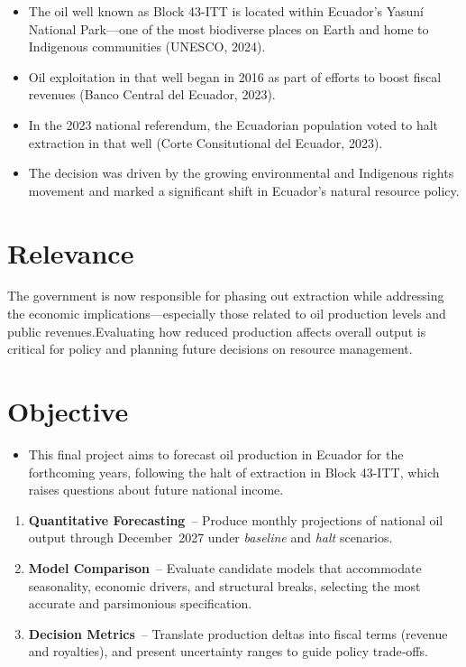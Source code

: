 \documentclass[
]{article}
\providecommand{\tightlist}{%
  \setlength{\itemsep}{0pt}\setlength{\parskip}{0pt}}
\begin{document}
\begin{itemize}
\item
  The oil well known as Block 43-ITT is located within Ecuador's Yasuní
  National Park---one of the most biodiverse places on Earth and home to
  Indigenous communities (UNESCO, 2024).
\item
  Oil exploitation in that well began in 2016 as part of efforts to
  boost fiscal revenues (Banco Central del Ecuador, 2023).
\item
  In the 2023 national referendum, the Ecuadorian population voted to
  halt extraction in that well (Corte Consitutional del Ecuador, 2023).
  \hspace{0pt}
\item
  The decision was driven by the growing environmental and Indigenous
  rights movement and marked a significant shift in Ecuador's natural
  resource policy.\hspace{0pt}
\end{itemize}

\section{Relevance}\label{relevance}

The government is now responsible for phasing out extraction while
addressing the economic implications---especially those related to oil
production levels and public revenues.\hspace{0pt}Evaluating how reduced
production affects overall output is critical for policy and planning
future decisions on resource management.

\section{Objective}\label{objective}

\begin{itemize}
\tightlist
\item
  This final project aims to forecast oil production in Ecuador for the
  forthcoming years, following the halt of extraction in Block 43-ITT,
  which raises questions about future national income.\hspace{0pt}
\end{itemize}

\begin{enumerate}
\def\labelenumi{\arabic{enumi}.}
\tightlist
\item
  \textbf{Quantitative Forecasting}~-- Produce monthly projections of
  national oil output through December~2027 under \emph{baseline} and
  \emph{halt} scenarios.
\item
  \textbf{Model Comparison}~-- Evaluate candidate models that
  accommodate seasonality, economic drivers, and structural breaks,
  selecting the most accurate and parsimonious specification.
\item
  \textbf{Decision Metrics}~-- Translate production deltas into fiscal
  terms (revenue and royalties), and present uncertainty ranges to guide
  policy trade‑offs.
\end{enumerate}
\end{document}
